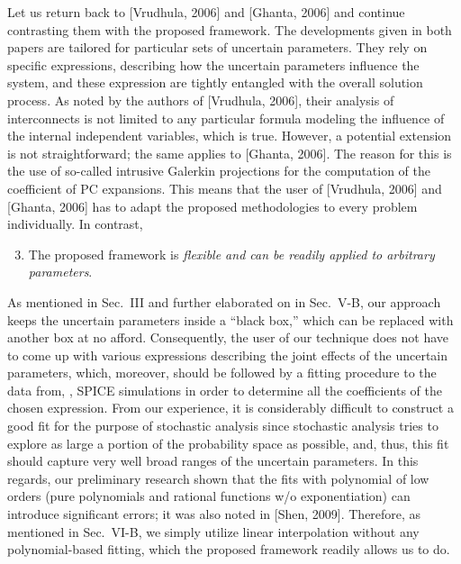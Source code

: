 \begin{authors}
Let us return back to [Vrudhula, 2006] and [Ghanta, 2006] and continue contrasting them with the proposed framework.
The developments given in both papers are tailored for particular sets of uncertain parameters.
They rely on specific expressions, describing how the uncertain parameters influence the system, and these expression are tightly entangled with the overall solution process.
As noted by the authors of [Vrudhula, 2006], their analysis of interconnects is not limited to any particular formula modeling the influence of the internal independent variables, which is true.
However, a potential extension is not straightforward; the same applies to [Ghanta, 2006].
The reason for this is the use of so-called intrusive Galerkin projections for the computation of the coefficient of PC expansions.
This means that the user of [Vrudhula, 2006] and [Ghanta, 2006] has to adapt the proposed methodologies to every problem individually.
In contrast,
\begin{enumerate}
  \setcounter{enumi}{2}
  \item The proposed framework is \emph{flexible and can be readily applied to arbitrary parameters}.
\end{enumerate}
As mentioned in Sec.~III and further elaborated on in Sec.~V-B, our approach keeps the uncertain parameters inside a ``black box,'' which can be replaced with another box at no afford.
Consequently, the user of our technique does not have to come up with various expressions describing the joint effects of the uncertain parameters, which, moreover, should be followed by a fitting procedure to the data from, \eg, SPICE simulations in order to determine all the coefficients of the chosen expression.
From our experience, it is considerably difficult to construct a good fit for the purpose of stochastic analysis since stochastic analysis tries to explore as large a portion of the probability space as possible, and, thus, this fit should capture very well broad ranges of the uncertain parameters.
In this regards, our preliminary research shown that the fits with polynomial of low orders (pure polynomials and rational functions w/o exponentiation) can introduce significant errors; it was also noted in [Shen, 2009].
Therefore, as mentioned in Sec.~VI-B, we simply utilize linear interpolation without any polynomial-based fitting, which the proposed framework readily allows us to do.


\end{authors}
